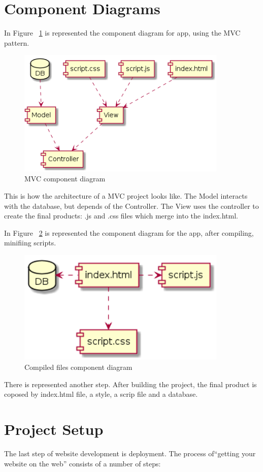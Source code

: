 \documentclass[12pt,a4paper,titlepage]{article}
\begin{document}
\section{Component Diagrams}
In Figure ~\ref{fig:intermediar} is represented the component diagram for app, using the MVC pattern.
\begin{figure}[H]
\centering
	\includegraphics[width=10cm]{intermediar}
	\caption{MVC component diagram}
	\label{fig:intermediar}
\end{figure}
This is how the architecture of a MVC project looks like. The Model interacts with the database, but depends of the Controller. The View uses the controller to create the final products: .js and .css files which merge into the index.html.

In Figure ~\ref{fig:final} is represented the component diagram for the app, after compiling, minifiing scripts.
\begin{figure}[H]
\centering
	\includegraphics[width=10cm]{final}
	\caption{Compiled files component diagram}
	\label{fig:final}
\end{figure}
There is represented another step. After building the project, the final product is coposed by index.html file, a style, a scrip file and a database.

\section{Project Setup}
The last step of website development is deployment. The process of“getting your website on the web” consists of a number of steps:
\end{document}

